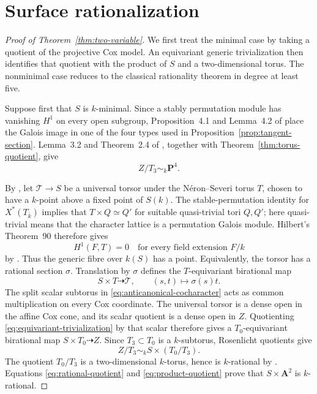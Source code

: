 \documentclass[11pt]{article}
\theoremstyle{remark}
\newcommand{\A}{\mathbf A}
\newcommand{\PP}{\mathbf P}
\begin{document}
\section{Surface rationalization}\label{sec:surface-proof}

\begin{proof}[Proof of Theorem~\ref{thm:two-variable}]
We first treat the minimal case by taking a quotient of the projective Cox
model.  An equivariant generic trivialization then identifies that quotient
with the product of \(S\) and a two-dimensional torus.  The nonminimal case
reduces to the classical rationality theorem in degree at least five.

Suppose first that \(S\) is \(k\)-minimal.  Since a stably permutation
module has vanishing \(H^1\) on every open subgroup, Proposition~4.1 and
Lemma~4.2 of \cite{TZ} place the Galois image in one of the four types used
in Proposition~\ref{prop:tangent-section}.  Lemma~3.2 and Theorem~2.4 of
\cite{TZ}, together with Theorem~\ref{thm:torus-quotient}, give
\begin{equation}
 Z/T_3\sim_k\PP^4.
 \label{eq:rational-quotient}
\end{equation}

By \cite[Corollary~3.5]{TZ}, let \(\mathcal T\to S\) be a universal torsor
under the N\'eron--Severi torus \(T\), chosen to have a \(k\)-point above a
fixed point of \(S(k)\).
The stable-permutation identity for \(X^*(T_{\bar k})\) implies that
\(T\times Q\simeq Q'\) for suitable quasi-trivial tori \(Q,Q'\); here
quasi-trivial means that the character lattice is a permutation Galois
module.
Hilbert's Theorem~90 therefore gives
\begin{equation}
 H^1(F,T)=0\quad\text{for every field extension }F/k
 \label{eq:H1-vanishing}
\end{equation}
by \cite[Remark~2.2]{TZ}.  Thus the generic fibre over \(k(S)\) has a point.
Equivalently, the torsor has a rational section \(\sigma\).  Translation by
\(\sigma\) defines the \(T\)-equivariant birational map
\begin{equation}
 S\times T\dashrightarrow\mathcal T,
 \qquad (s,t)\longmapsto\sigma(s)t.
 \label{eq:equivariant-trivialization}
\end{equation}
The split scalar subtorus in \eqref{eq:anticanonical-cocharacter} acts as
common multiplication on every Cox coordinate.  The universal torsor is a
dense open in the affine Cox cone, and its scalar quotient is a dense open
in \(Z\).  Quotienting \eqref{eq:equivariant-trivialization} by that scalar
therefore gives a \(T_0\)-equivariant birational map
\(S\times T_0\dashrightarrow Z\).  Since
\(T_3\subset T_0\) is a \(k\)-subtorus, Rosenlicht quotients give
\begin{equation}
 Z/T_3\sim_k S\times(T_0/T_3).
 \label{eq:product-quotient}
\end{equation}
The quotient \(T_0/T_3\) is a two-dimensional \(k\)-torus, hence is
\(k\)-rational by \cite{Voskresenskii1967}.  Equations
\eqref{eq:rational-quotient} and \eqref{eq:product-quotient} prove that
\(S\times\A^2\) is \(k\)-rational.


\end{proof}
\end{document}
